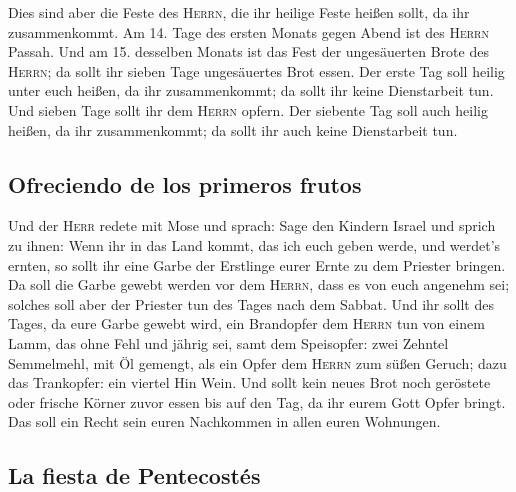  Dies sind aber die Feste des \textsc{Herrn}, die ihr
heilige Feste heißen sollt, da ihr zusammenkommt.  Am 14.
Tage des ersten Monats gegen Abend ist des \textsc{Herrn} Passah.
 Und am 15. desselben Monats ist das Fest der ungesäuerten
Brote des \textsc{Herrn}; da sollt ihr sieben Tage ungesäuertes Brot
essen.  Der erste Tag soll heilig unter euch heißen, da
ihr zusammenkommt; da sollt ihr keine Dienstarbeit tun. 
Und sieben Tage sollt ihr dem \textsc{Herrn} opfern. Der siebente Tag
soll auch heilig heißen, da ihr zusammenkommt; da sollt ihr auch keine
Dienstarbeit tun.

\hypertarget{ofreciendo-de-los-primeros-frutos}{%
\subsection{Ofreciendo de los primeros
frutos}\label{ofreciendo-de-los-primeros-frutos}}

 Und der \textsc{Herr} redete mit Mose und sprach:
 Sage den Kindern Israel und sprich zu ihnen: Wenn ihr in
das Land kommt, das ich euch geben werde, und werdet's ernten, so sollt
ihr eine Garbe der Erstlinge eurer Ernte zu dem Priester bringen.
 Da soll die Garbe gewebt werden vor dem \textsc{Herrn},
dass es von euch angenehm sei; solches soll aber der Priester tun des
Tages nach dem Sabbat.  Und ihr sollt des Tages, da eure
Garbe gewebt wird, ein Brandopfer dem \textsc{Herrn} tun von einem Lamm,
das ohne Fehl und jährig sei,  samt dem Speisopfer: zwei
Zehntel Semmelmehl, mit Öl gemengt, als ein Opfer dem \textsc{Herrn} zum
süßen Geruch; dazu das Trankopfer: ein viertel Hin Wein. 
Und sollt kein neues Brot noch geröstete oder frische Körner zuvor essen
bis auf den Tag, da ihr eurem Gott Opfer bringt. Das soll ein Recht sein
euren Nachkommen in allen euren Wohnungen.

\hypertarget{la-fiesta-de-pentecostuxe9s}{%
\subsection{La fiesta de
Pentecostés}\label{la-fiesta-de-pentecostuxe9s}}


